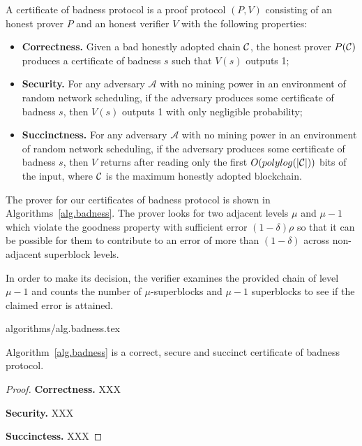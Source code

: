 \begin{definition}
A certificate of badness protocol is a proof protocol $(P, V)$ consisting of an
honest prover $P$ and an honest verifier $V$ with the following properties:

\begin{itemize}
  \item \textbf{Correctness.} Given a bad honestly adopted chain $\mathcal{C}$, the
  honest prover $P(\mathcal{C})$ produces a certificate of badness $s$ such that
  $V(s)$ outputs 1;
  \item \textbf{Security.} For any adversary $\mathcal{A}$ with no mining power
  in an environment of random network scheduling, if the adversary produces
  some certificate of badness $s$, then $V(s)$ outputs 1 with only negligible
  probability;
  \item \textbf{Succinctness.} For any adversary $\mathcal{A}$ with no mining
  power in an environment of random network scheduling, if the adversary
  produces some certificate of badness $s$, then $V$ returns after reading only
  the first $O(polylog(|\mathcal{C}|))$ bits of the input, where $\mathcal{C}$ is the
  maximum honestly adopted blockchain.
\end{itemize}
\end{definition}

The prover for our certificates of badness protocol is shown in
Algorithms~\ref{alg.badness}. The prover looks for two adjacent levels $\mu$ and
$\mu - 1$ which violate the goodness property with sufficient error
$(1 - \delta)\rho$ so that it can be possible for them to contribute to an error
of more than $(1 - \delta)$ across non-adjacent superblock levels.

In order to make its decision, the verifier examines the provided chain of level
$\mu - 1$ and counts the number of $\mu$-superblocks and $\mu - 1$ superblocks
to see if the claimed error is attained.

{algorithms/alg.badness.tex}

\begin{theorem}
Algorithm~\ref{alg.badness} is a correct, secure and succinct certificate of
badness protocol.
\end{theorem}
\begin{proof}

  \textbf{Correctness.} XXX

  \textbf{Security.} XXX

  \textbf{Succinctess.} XXX
\end{proof}
